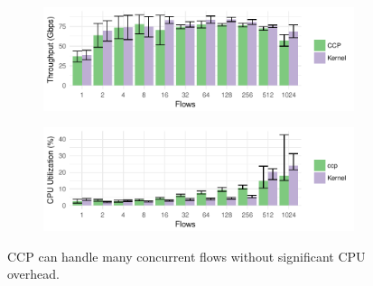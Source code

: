 \begin{figure}[t]
\centering
    \begin{subfigure}{0.48\textwidth}
        \centering
        \includegraphics[width=\columnwidth]{img/numflows-throughput}
        \label{fig:eval:perf:numflows}
    \end{subfigure}
    \begin{subfigure}{0.48\textwidth}
        \centering
        \includegraphics[width=\columnwidth]{img/10G-cpu-util}
        \label{fig:eval:perf:10g}
    \end{subfigure}
    \caption{CCP can handle many concurrent flows without significant CPU overhead.}\label{fig:eval:perf}
\end{figure}

